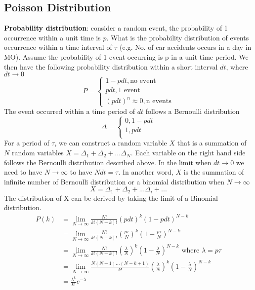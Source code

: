 \documentclass[12pt, oneside]{article}
\begin{document}
\subsection{Poisson Distribution}
\textbf{Probability distribution}: consider a random event, the probability of 1 occurrence within a unit time is $p$. What is the probability distribution of events occurrence within a time interval of $\tau$ (e.g. No. of car accidents occurs in a day in MO). 
Assume the probability of 1 event occurring is p in a unit time period. We then have the following probability distribution within a short interval $dt$, where $dt\rightarrow 0$
\begin{equation*}
P=
\begin{cases}
1-pdt, \text{no event}\\
pdt, \text{1 event}\\
(pdt)^n\approx 0, \text{n events}
\end{cases}
\end{equation*}
The event occurred within a time period of $dt$ follows a Bernoulli distribution
\begin{equation*}
{\Delta}=
\begin{cases}
0, 1-pdt\\
1, pdt\\
\end{cases}
\end{equation*}
For a period of $\tau$, we can construct a random variable $X$ that is a summation of $N$ random variables $X=\Delta_1+\Delta_2+...\Delta_N$. Each variable on the right hand side follows the Bernoulli distribution described above. In the limit when $dt \rightarrow 0$ we need to have $N\rightarrow \infty$ to have $Ndt=\tau$. In another word, $X$ is the summation of infinite number of Bernoulli distribution or a binomial distribution when $N\rightarrow \infty$
$$X=\Delta_1+\Delta_2+...\Delta_i+...$$
The distribution of X can be derived by taking the limit of a Binomial distribution.
\begin{align*}
P(k)&=\lim_{N \rightarrow \infty}\frac{N!}{k!(N-k)!}(pdt)^k(1-pdt)^{N-k}\\
&=\lim_{N \rightarrow \infty}\frac{N!}{k!(N-k)!}(\frac{p\tau}{N})^k(1-\frac{p\tau}{N})^{N-k}\\
&=\lim_{N \rightarrow \infty}\frac{N!}{k!(N-k)!}(\frac{\lambda}{N})^k(1-\frac{\lambda}{N})^{N-k} \text{ where } \lambda=p\tau\\
&=\lim_{N \rightarrow \infty}\frac{N(N-1)...(N-k+1)}{k!}(\frac{\lambda}{N})^k(1-\frac{\lambda}{N})^{N-k}\\
&=\frac{\lambda^k}{k!}e^{-\lambda}
\end{align*}
\end{document}
